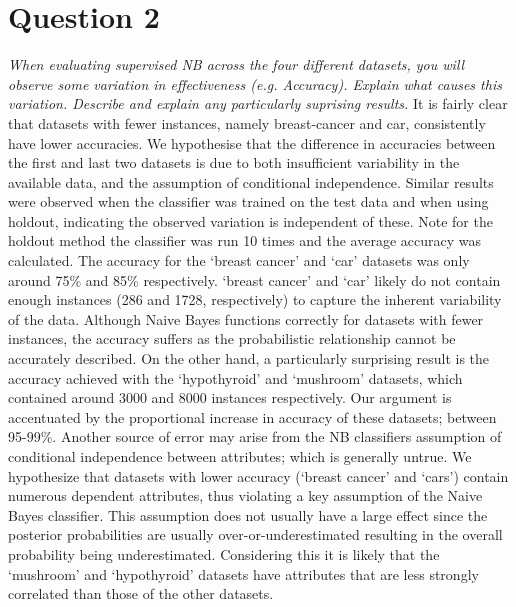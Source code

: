 \documentclass[a4paper]{article}
\begin{document}
\section*{Question 2}
\textit{When evaluating supervised NB across the four different datasets, you will observe some variation in effectiveness (e.g. Accuracy). Explain what causes this variation. Describe and explain any particularly suprising results.}
\newline
\newline
It is fairly clear that datasets with fewer instances, namely breast-cancer and car, consistently have lower accuracies. We hypothesise that the difference in accuracies between the first and last two datasets is due to both insufficient variability in the available data, and the assumption of conditional independence. Similar results were observed when the classifier was trained on the test data and when using holdout, indicating the observed variation is independent of these. Note for the holdout method the classifier was run 10 times and the average accuracy was calculated.
\newline
\newline
The accuracy for the ‘breast cancer’ and ‘car’ datasets was only around 75\% and 85\% respectively. ‘breast cancer’ and ‘car’ likely do not contain enough instances (286 and 1728, respectively) to capture the inherent variability of the data. Although Naive Bayes functions correctly for datasets with fewer instances, the accuracy suffers as the probabilistic relationship cannot be accurately described. On the other hand, a particularly surprising result is the accuracy achieved with the ‘hypothyroid’ and ‘mushroom’ datasets, which contained around 3000 and 8000 instances respectively. Our argument is accentuated by the proportional increase in accuracy of these datasets; between 95-99\%.
\newline
\newline
Another source of error may arise from the NB classifiers assumption of conditional independence between attributes; which is generally untrue. We hypothesize that datasets with lower accuracy (‘breast cancer’ and ‘cars’) contain numerous dependent attributes, thus violating a key assumption of the Naive Bayes classifier. This assumption does not usually have a large effect since the posterior probabilities are usually over-or-underestimated resulting in the overall probability being underestimated. Considering this it is likely that the ‘mushroom’ and ‘hypothyroid’ datasets have attributes that are less strongly correlated than those of the other datasets.
\end{document}

